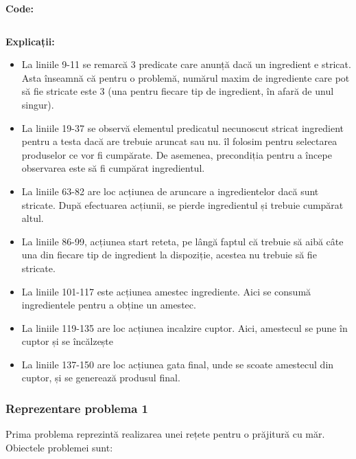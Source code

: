 \textbf{Code:}

    \inputminted[linenos]{C}{cod/domain_reteta_contingent.pddl}


\textbf{ Explicații:}
    
  \begin{itemize}
    \setlength\itemsep{0em}
    \item La liniile 9-11 se remarcă 3 predicate care anunță dacă un ingredient e stricat. Asta înseamnă că pentru o problemă, numărul 
  maxim de ingrediente care pot să fie stricate este 3 (una pentru fiecare tip de ingredient, în afară de unul singur).
    \item La liniile 19-37 se observă elementul predicatul necunoscut stricat ingredient pentru a testa dacă are trebuie aruncat sau nu.
  îl folosim pentru selectarea produselor ce vor fi cumpărate. De asemenea, precondiția pentru a începe observarea este să fi cumpărat ingredientul.
    \item 	La liniile 63-82 are loc acțiunea de aruncare a ingredientelor dacă sunt stricate. După efectuarea acțiunii, se pierde ingredientul
  și trebuie cumpărat altul.
    \item La liniile 86-99, acțiunea start reteta, pe lângă faptul că trebuie să aibă câte una din fiecare tip de ingredient la dispoziție, 
  acestea nu trebuie să fie stricate.  
    \item La liniile 101-117 este acțiunea amestec ingrediente. Aici se consumă ingredientele pentru a obține un amestec.
    \item La liniile 119-135 are loc acțiunea incalzire cuptor. Aici, amestecul se pune în cuptor și se încălzește
    \item La  liniile 137-150 are loc acțiunea gata final, unde se scoate amestecul din cuptor, și se generează produsul final.
  
\end{itemize}


\newpage

\subsubsection{Reprezentare problema 1}
Prima problema reprezintă realizarea unei rețete pentru o prăjitură cu măr.
Obiectele problemei sunt:

